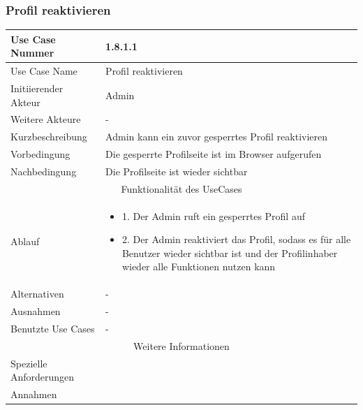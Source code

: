 \documentclass[10pt,a4paper]{article}
\begin{document}
			\subsubsection{Profil reaktivieren}
		\begin{tabular}{|l|p{.5\linewidth}|}
		\hline Use Case Nummer & 1.8.1.1 \\ 
		\hline Use Case Name & Profil reaktivieren \\ 
		\hline Initiierender Akteur & Admin \\
		\hline Weitere Akteure & - \\
		\hline Kurzbeschreibung & Admin kann ein zuvor gesperrtes Profil reaktivieren \\
		\hline Vorbedingung & Die gesperrte Profilseite ist im Browser aufgerufen \\
		\hline Nachbedingung & Die Profilseite ist wieder sichtbar \\
		\hline \multicolumn{2}{|c|}{Funktionalität des UseCases}\\
		\hline Ablauf & \begin{itemize}
					\item 1. Der Admin ruft ein gesperrtes Profil auf
					\item 2. Der Admin reaktiviert das Profil, sodass es f\"ur alle Benutzer wieder sichtbar ist und der Profilinhaber wieder alle Funktionen nutzen kann
				\end{itemize}\\
		\hline Alternativen & - \\
		\hline Ausnahmen & - \\
		\hline Benutzte Use Cases & - \\
		\hline \multicolumn{2}{|c|}{Weitere Informationen} \\
		\hline Spezielle Anforderungen &  \\
		\hline Annahmen &  \\
		\hline
		\end{tabular}
		
\end{document}

